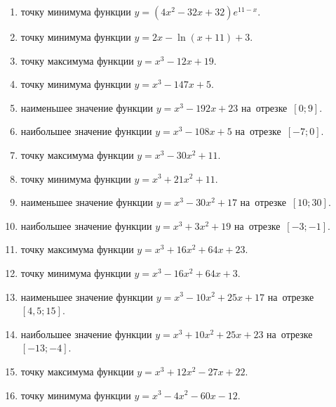 \documentclass[a4paper,10pt]{article}
\begin{document}
\begin{enumerate}
\item {} точку минимума функции $y=\left(4x^2-32x+32\right){{e}^{11-x}}$.

\item {} точку минимума функции $y=2x-\ln \left(x+11\right)+3$.

\item {} точку максимума функции $y=x^3 -12x +19$.

\item {} точку минимума функции $y=x^3 -147x+5$.

\item {} наименьшее значение функции $y=x^3 -192x+23$ на~отрезке~$\left[0;9\right]$.

\item {} наибольшее значение функции $y=x^3 -108x+5$ на~отрезке~$\left[-7;0\right]$.

\item {} точку максимума функции $y=x^3 -30x^2+11$.

\item {} точку минимума функции $y=x^3 +21x^2+11$.

\item {} наименьшее значение функции $y=x^3 -30x^2+17$ на~отрезке~$\left[10;30\right]$.

\item {} наибольшее значение функции $y=x^3 +3x^2+19$ на~отрезке~$\left[-3;-1\right]$.

\item {} точку максимума функции $y=x^3 +16x^2+64x+23$.

\item {} точку минимума функции $y=x^3 -16x^2+64x+3$.

\item {} наименьшее значение функции $y=x^3 -10x^2+25x+17$ на~отрезке~$\left[4,5;15\right]$.

\item {} наибольшее значение функции $y=x^3 +10x^2+25x+23$ на~отрезке~$\left[-13;-4\right]$.

\item {} точку максимума функции $y=x^3 +12x^2-27x+22$.

\item {} точку минимума функции $y=x^3 -4x^2-60x-12$.


\end{enumerate}
\end{document}
